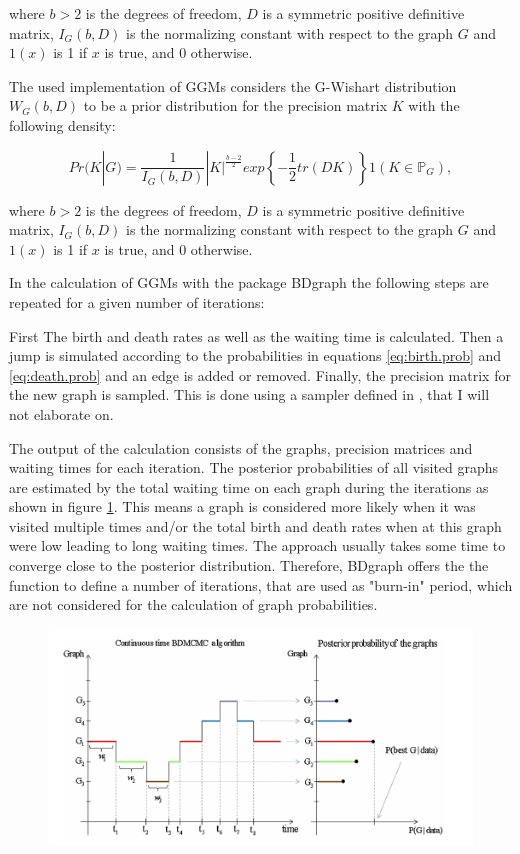 \documentclass[a4paper,12pt,twoside,openright]{report}
\begin{document}
where $b>2$ is the degrees of freedom, $D$ is a symmetric positive definitive matrix, $I_G(b,D)$ is the normalizing constant with respect to the graph $G$ and $1(x)$ is 1 if $x$ is true, and 0 otherwise.

\newpage
The used implementation of GGMs considers the G-Wishart distribution $W_G(b,D)$ to be a prior distribution for the precision matrix $K$ with the following density:

\begin{equation}
Pr(K|G) = \frac{1}{I_G(b,D)}|K|^{\frac{b-2}{2}}exp\left\lbrace-\frac{1}{2}tr(DK)\right\rbrace 1(K \in \mathbb{P}_G),
\end{equation}

where $b>2$ is the degrees of freedom, $D$ is a symmetric positive definitive matrix, $I_G(b,D)$ is the normalizing constant with respect to the graph $G$ and $1(x)$ is 1 if $x$ is true, and 0 otherwise.

In the calculation of GGMs with the package BDgraph the following steps are repeated for a given number of iterations:

First The birth and death rates as well as the waiting time is calculated. Then a jump is simulated according to the probabilities in equations \ref{eq:birth.prob} and \ref{eq:death.prob} and an edge is added or removed. Finally, the precision matrix for the new graph is sampled. This is done using a sampler defined in \cite{Mohammadi2015}, that I will not elaborate on.  

The output of the calculation consists of the graphs, precision matrices and waiting times for each iteration. The posterior probabilities of all visited graphs are estimated by the total waiting time on each graph during the iterations as shown in figure \ref{fig:bdgraph.waiting.graph}. This means a graph is considered more likely when it was visited multiple times and/or the total birth and death rates when at this graph were low leading to long waiting times. The approach usually takes some time to converge close to the posterior distribution. Therefore, BDgraph offers the the function to define a number of iterations, that are used as "burn-in" period, which are not considered for the calculation of graph probabilities.  

\begin{figure}[b!]
\begin{center}
	\includegraphics[scale=1.2, keepaspectratio = true]{../figures/bdgraph_waiting_graph}
	\end{center}
	\caption{}
	\label{fig:bdgraph.waiting.graph}
\end{figure}
\end{document}
